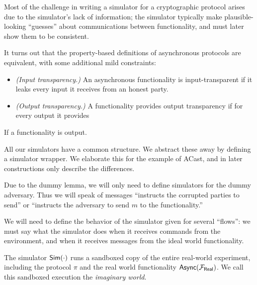 Most of the challenge in writing a simulator for a cryptographic protocol arises due to the simulator's lack of information; the simulator typically make plausible-looking ``guesses'' about communications between functionality, and must later show them to be consistent.

It turns out that the property-based definitions of asynchronous protocols are equivalent, with some additional mild constraints:
\begin{itemize}
\item \emph{(Input transparency.)} An asynchronous functionality is input-transparent if it leaks every input it receives from an honest party.
\item \emph{(Output transparency.)} A functionality provides output transparency if for every output it provides 
\end{itemize}
If a functionality is output.

All our simulators have a common structure. We abstract these away by defining a simulator wrapper. We elaborate this for the example of ACast, and in later constructions only describe the differences.

Due to the dummy lemma, we will only need to define simulators for the dummy adversary. Thus we will speak of messages ``instructs the corrupted parties to send'' or ``instructs the adversary to send $m$ to the functionality.''

We will need to define the behavior of the simulator given for several ``flows'': we must say what the simulator does when it receives commands from the environment, and when it receives messages from the ideal world functionality.

The simulator ${\mathsf {Sim}}(\cdot)$ runs a sandboxed copy of the entire real-world experiment, including the protocol $\pi$ and the real world functionality $\msf{Async}(\F{Real})$. We call this sandboxed execution the \emph{imaginary world}.


